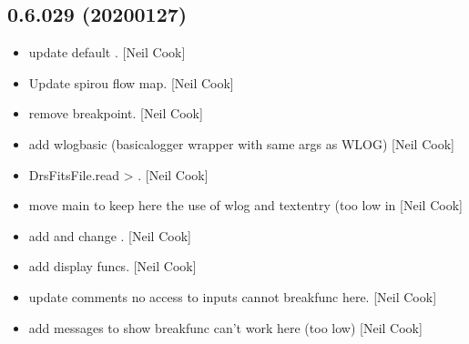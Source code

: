 \documentclass[a4paper,10pt,english]{report}
\begin{document}
\subsection{0.6.029 (2020\sphinxhyphen{}01\sphinxhyphen{}27)}
\label{\detokenize{misc/changelog:id8}}\begin{itemize}
\item {} 
 \sphinxhyphen{} update default
. {[}Neil Cook{]}

\item {} 
Update spirou flow map. {[}Neil Cook{]}

\item {} 
 \sphinxhyphen{} remove breakpoint. {[}Neil
Cook{]}

\item {} 
 \sphinxhyphen{} add wlogbasic (basicalogger wrapper
with same args as WLOG) {[}Neil Cook{]}

\item {} 
DrsFitsFile.read \textendash{}\textgreater{} . {[}Neil Cook{]}

\item {} 
 \sphinxhyphen{} move  main to  \sphinxhyphen{}
keep here the use of wlog and textentry (too low in 
{[}Neil Cook{]}

\item {} 
 \sphinxhyphen{} add  and change .
{[}Neil Cook{]}

\item {} 
 \sphinxhyphen{} add display funcs. {[}Neil Cook{]}

\item {} 
 \sphinxhyphen{} update  comments \sphinxhyphen{} no access to
inputs cannot breakfunc here. {[}Neil Cook{]}

\item {} 
 \sphinxhyphen{} add messages to show 
breakfunc can’t work here (too low) {[}Neil Cook{]}


\end{itemize}
\end{document}
